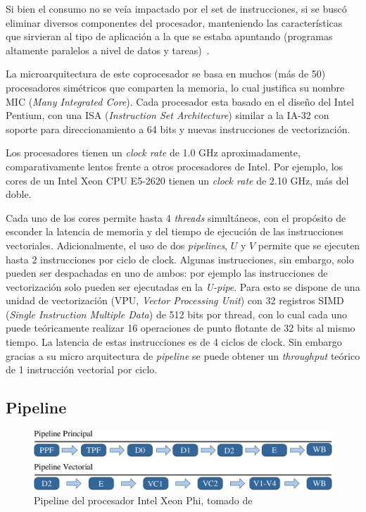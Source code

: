 Si bien el consumo no se ve\'ia impactado por el set de instrucciones,
si se busc\'o eliminar diversos componentes del procesador, manteniendo las caracter\'isticas
que sirvieran al tipo de aplicaci\'on a la que se estaba
apuntando (programas altamente paralelos a nivel de datos y tareas)~\cite{BookXeonPhi}.

La microarquitectura de este coprocesador se basa en muchos (m\'as de 50) procesadores sim\'etricos que comparten la memoria, lo
cual justifica su nombre MIC (\textit{Many Integrated Core}). Cada procesador esta basado
en el dise\~no del Intel Pentium, con una ISA (\textit{Instruction Set Architecture}) similar a la IA-32 con
soporte para direccionamiento a 64 bits y nuevas instrucciones de vectorizaci\'on.

Los procesadores tienen un \textit{clock rate} de 1.0 GHz aproximadamente, comparativamente lentos frente
a otros procesadores de Intel. Por ejemplo, los cores de un Intel Xeon CPU E5-2620 tienen un \textit{clock rate}
de 2.10 GHz, m\'as del doble.

Cada uno de los cores permite hasta 4 \textit{threads} simult\'aneos, con el prop\'osito de esconder la latencia de memoria y del tiempo de ejecuci\'on de
las instrucciones vectoriales. Adicionalmente, el uso de dos \textit{pipelines}, $U$ y $V$ permite que se ejecuten hasta 2
instrucciones por ciclo de clock.  Algunas instrucciones, sin embargo, solo pueden ser despachadas en uno de ambos:
por ejemplo las instrucciones de vectorizaci\'on solo pueden ser ejecutadas en la \textit{U-pipe}. Para esto se dispone
de una unidad de vectorizaci\'on (VPU, \textit{Vector Processing Unit}) con 32 registros SIMD (\textit{Single Instruction
Multiple Data}) de 512 bits por thread, con lo cual cada uno puede te\'oricamente realizar 16 operaciones de punto flotante de
32 bits al mismo tiempo. La latencia de estas instrucciones es de 4 ciclos de clock. Sin embargo gracias a su micro
arquitectura de \textit{pipeline} se puede obtener un \textit{throughput} te\'orico de 1 instrucci\'on vectorial por ciclo.

\subsection{Pipeline}

\begin{figure}[htbp]
   \centering
   \includegraphics[width=\plotwidth]{images/xeon-phi-pipeline.pdf}
   \caption{Pipeline del procesador Intel Xeon Phi, tomado de~\cite{BookXeonPhi} }
   \label{fig::xeon_phi_pipeline}
\end{figure}

